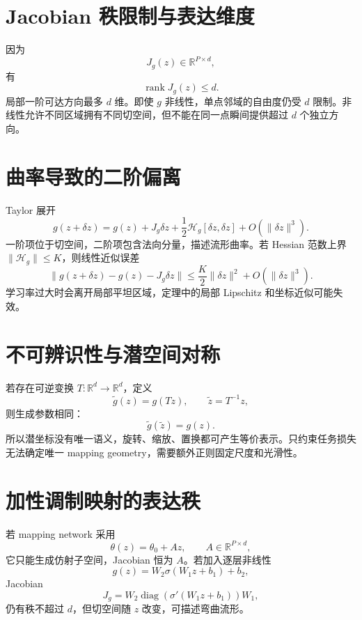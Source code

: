 \documentclass[UTF8,12pt,a4paper,fontset=none]{ctexart}
\numberwithin{equation}{section}
\newcommand{\R}{\mathbb{R}}
\newcommand{\rank}{\operatorname{rank}}
\begin{document}
\section{Jacobian 秩限制与表达维度}
因为
\begin{equation}
 J_g(z)\in\R^{P\times d},
\end{equation}
有
\begin{equation}
 \rank J_g(z)\le d.
\end{equation}
局部一阶可达方向最多 $d$ 维。即使 $g$ 非线性，单点邻域的自由度仍受 $d$ 限制。非线性允许不同区域拥有不同切空间，但不能在同一点瞬间提供超过 $d$ 个独立方向。

\section{曲率导致的二阶偏离}
Taylor 展开
\begin{equation}
 g(z+\delta z)=g(z)+J_g\delta z+
 \frac12\mathcal H_g[\delta z,\delta z]+O(\|\delta z\|^3).
\end{equation}
一阶项位于切空间，二阶项包含法向分量，描述流形曲率。若 Hessian 范数上界 $\|\mathcal H_g\|\le K$，则线性近似误差
\begin{equation}
 \|g(z+\delta z)-g(z)-J_g\delta z\|
 \le\frac K2\|\delta z\|^2+O(\|\delta z\|^3).
\end{equation}
学习率过大时会离开局部平坦区域，定理中的局部 Lipschitz 和坐标近似可能失效。

\section{不可辨识性与潜空间对称}
若存在可逆变换 $T:\R^d\to\R^d$，定义
\begin{equation}
 \widetilde g(z)=g(Tz),
 \qquad \widetilde z=T^{-1}z,
\end{equation}
则生成参数相同：
\begin{equation}
 \widetilde g(\widetilde z)=g(z).
\end{equation}
所以潜坐标没有唯一语义，旋转、缩放、置换都可产生等价表示。只约束任务损失无法确定唯一 mapping geometry，需要额外正则固定尺度和光滑性。

\section{加性调制映射的表达秩}
若 mapping network 采用
\begin{equation}
 \theta(z)=\theta_0+Az,
 \qquad A\in\R^{P\times d},
\end{equation}
它只能生成仿射子空间，Jacobian 恒为 $A$。若加入逐层非线性
\begin{equation}
 g(z)=W_2\sigma(W_1z+b_1)+b_2,
\end{equation}
Jacobian
\begin{equation}
 J_g=W_2\operatorname{diag}(\sigma'(W_1z+b_1))W_1,
\end{equation}
仍有秩不超过 $d$，但切空间随 $z$ 改变，可描述弯曲流形。
\end{document}
